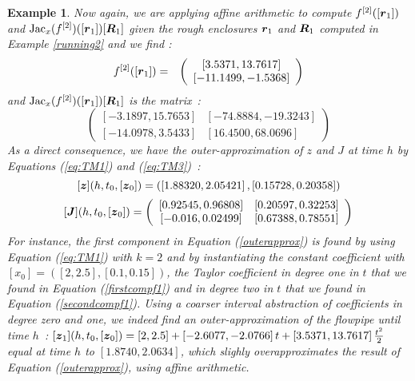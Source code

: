 \documentclass{sig-alternate-05-2015} %
\newcommand\ForAuthors[1]%
 {\par\smallskip                     %
  \begin{center}%
   \fbox%
   {\parbox{0.9\linewidth}%
    {\raggedright\sc--- #1}%
   }%
  \end{center}%
  \par\smallskip                     %
 }
\newtheorem{example}{Example}
\def\intvl#1{\mbox{$[ #1 ]$}}
\begin{document}
\begin{example}
Now again, we are applying affine arithmetic to compute 
$f^{[2]}([{\r}_{1}])$ and $\mbox{Jac}_x(f^{[2]})([{\r}_{1}]) [\bfm{R}_{1}]$
given the rough enclosures $\r_1$ and $\bfm{R}_1$ computed in Example
\ref{running2} and we find : 
\begin{eqnarray}
f^{[2]}([{\r}_{1}]) & = & \left(\begin{array}{c}
\left[    3.5371,   13.7617\right] \\
\left[  -11.1499,   -1.5368\right]
\end{array}\right)
\label{secondcompf1}
\end{eqnarray}
and $\mbox{Jac}_x(f^{[2]})([{\r}_{1}]) [\bfm{R}_{1}]$ is the matrix~: 
$$
\left(\begin{array}{cc}
\left[   -3.1897,   15.7653\right] & \left[  -74.8884,  -19.3243\right] \\
\left[  -14.0978,    3.5433\right] & \left[   16.4500,   68.0696\right]
\end{array}\right)
$$
As a direct consequence, we have the outer-approximation of $z$ and $J$ at time $h$ by Equations 
(\ref{eq:TM1}) and (\ref{eq:TM3})~: 
\begin{equation}
\intvl{\z}(h,t_0,[{\z}_0]) = \left(\left[1.88320, 2.05421\right], \left[0.15728, 0.20358\right]\right) 
\label{outerapprox}
\end{equation}
\begin{equation}
\intvl{\J}(h,t_0,[{\z}_0]) = \left(\begin{array}{cc}
\left[0.92545, 0.96808\right] & \left[0.20597, 0.32253\right] \\
\left[-0.016, 0.02499\right] & \left[0.67388, 0.78551\right]
\end{array}\right)
\label{outerapproxJ}
\end{equation}
For instance, the first component in Equation (\ref{outerapprox}) is found by using Equation (\ref{eq:TM1}) with
$k=2$ and by instantiating the constant coefficient with
$\intvl{x_0}=\left(\left[2,2.5\right], \left[0.1,0.15\right]\right)$, the Taylor coefficient in degree one in $t$ 
that we found in Equation (\ref{firstcompf1}) and in degree two in $t$ that we found in Equation 
(\ref{secondcompf1}). Using a coarser interval abstraction of coefficients in degree zero and one, we indeed
find an outer-approximation of the flowpipe until time $h$~: 
$\intvl{\z_1}(h,t_0,[{\z}_0]) = \left[2,2.5\right]+\left[-2.6077,-2.0766\right]t
+\left[    3.5371,   13.7617\right]
\frac{t^2}{2}$
\noindent equal at time $h$ to $\left[1.8740,2.0634\right]$, 
which slighly overapproximates the result of Equation (\ref{outerapprox}), using affine arithmetic. 
\end{example}
\end{document}
